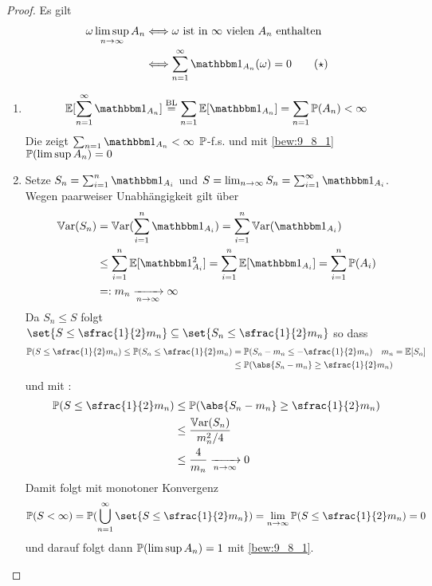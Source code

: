 \begin{proof}
	Es gilt
	\begin{align*}
		\omega \limsup_{n \to \infty} A_n &\Longleftrightarrow \omega \text{ ist in } \infty \text{ vielen } A_n \text{ enthalten}\\
		&\Longleftrightarrow \sum_{n=1}^{\infty} \indi_{A_n}(\omega) = 0 \tag{$\star$} \label{bew:9_8_1}
	\end{align*}
	\begin{enumerate}
		\item 
		\begin{align*}
			\E[\sum_{n=1}^{\infty} \indi_{A_n}] \overset{\text{BL}}{=} \sum_{n=1} \E[\indi_{A_n}] = \sum_{n=1}\P(A_n) < \infty
		\end{align*}
		Die zeigt $\sum_{n=1} \indi_{A_n} < \infty$ $\P$-f.s. und mit \eqref{bew:9_8_1} $\P(\limsup A_n) = 0$
		\item Setze $S_n = \sum_{i=1}^n \indi_{A_i}$ und $S= \lim_{n\to \infty} S_n = \sum_{i=1}^{\infty} \indi_{A_i}$. Wegen paarweiser Unabhängigkeit gilt über 
		\begin{align*}
			\Var(S_n) &= \Var(\sum^n_{i=1} \indi_{A_i}) = \sum_{i=1}^n \Var(\indi_{A_i})\\
			&\le \sum_{i=1}^n \E[\indi^2_{A_i}] = \sum_{i=1}^n \E[\indi_{A_i}] = \sum_{i=1}^n \P(A_i)\\
			&=: m_n \xrightarrow[n \to \infty]{}\infty
		\end{align*}
		Da $S_n \le S$ folgt $\set{S\le \sfrac{1}{2}m_n}\subseteq \set{S_n \le \sfrac{1}{2} m_n}$ so dass
		\begin{align*}
			\P(S \le \sfrac{1}{2} m_n) \le \P(S_n \le \sfrac{1}{2} m_n) &= \P(S_n - m_n \le - \sfrac{1}{2} m_n) \quad m_n = \E[S_n]\\
			&\le \P(\abs{S_n - m_n} \ge \sfrac{1}{2}m_n)
		\end{align*}
		und mit :
		\begin{align*}
			\P(S \le \sfrac{1}{2} m_n) &\le \P(\abs{S_n - m_n} \ge \sfrac{1}{2}m_n)\\
			&\le \frac{\Var(S_n)}{m_n^2/4}\\
			&\le \frac{4}{m_n} \xrightarrow[n \to \infty]{} 0
		\end{align*}
		Damit folgt mit monotoner Konvergenz
		\begin{align*}
			\P(S < \infty) = \P(\bigcup_{n=1}^{\infty} \set{S \le \sfrac{1}{2}m_n}) = \lim_{n\to \infty} \P(S \le \sfrac{1}{2} m_n) = 0
		\end{align*}
		und darauf folgt dann $\P(\limsup A_n) = 1$ mit \eqref{bew:9_8_1}.
	\end{enumerate}
\end{proof}
